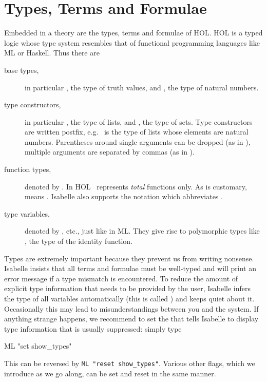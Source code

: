 \section{Types, Terms and Formulae}
\label{sec:TypesTermsForms}

Embedded in a theory are the types, terms and formulae of HOL\@. HOL is a typed
logic whose type system resembles that of functional programming languages
like ML or Haskell. Thus there are
\begin{description}
\item[base types,] in particular , the type of truth values,
and , the type of natural numbers.
\item[type constructors,] in particular , the type of
lists, and , the type of sets. Type constructors are written
postfix, e.g.\  is the type of lists whose elements are
natural numbers. Parentheses around single arguments can be dropped (as in
), multiple arguments are separated by commas (as in
).
\item[function types,] denoted by \isasymFun{}.
  In HOL \isasymFun\ represents \emph{total} functions only. As is customary,
   means
  . Isabelle also
  supports the notation 
  which abbreviates .
\item[type variables,]
  denoted by ,  etc., just like in ML\@. They give rise
  to polymorphic types like , the type of the identity
  function.
\end{description}
\begin{warn}
  Types are extremely important because they prevent us from writing
  nonsense.  Isabelle insists that all terms and formulae must be well-typed
  and will print an error message if a type mismatch is encountered. To
  reduce the amount of explicit type information that needs to be provided by
  the user, Isabelle infers the type of all variables automatically (this is
  called ) and keeps quiet about it. Occasionally
  this may lead to misunderstandings between you and the system. If anything
  strange happens, we recommend to set the 
   that tells Isabelle to display type information
  that is usually suppressed: simply type
\begin{ttbox}
ML "set show_types"
\end{ttbox}

\noindent
This can be reversed by \texttt{ML "reset show_types"}. Various other flags,
which we introduce as we go along,
can be set and reset in the same manner.
\end{warn}


